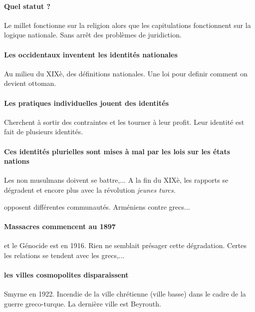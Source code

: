 \paragraph{Quel statut ?}
 Le millet fonctionne sur la religion alors que les capitulations fonctionnent sur la logique nationale. Sans arrêt des problèmes de juridiction.

 \paragraph{Les occidentaux inventent les identités nationales}
 Au milieu du XIXè, des définitions nationales. Une loi pour definir comment on devient ottoman.

 \paragraph{Les pratiques individuelles jouent des identités} Cherchent à sortir des contraintes et les tourner à leur profit. Leur identité est fait de plusieurs identités. 

 \paragraph{Ces identités plurielles sont mises à mal par les lois sur les états nations} Les non musulmans doivent se battre,... A la fin du XIXè, les rapports se dégradent et encore plus avec la révolution \textit{jeunes turcs}. 
 \begin{Ex}
     opposent différentes communautés. Arméniens contre grecs...
 \end{Ex}

 \paragraph{Massacres commencent au 1897} et le Génocide est en 1916. Rien ne semblait présager cette dégradation. Certes les relations se tendent avec les grecs,...

 \paragraph{les villes cosmopolites disparaissent} Smyrne en 1922. Incendie de la ville chrétienne (ville basse) dans le cadre de la guerre greco-turque. 
 La dernière ville est Beyrouth. 


